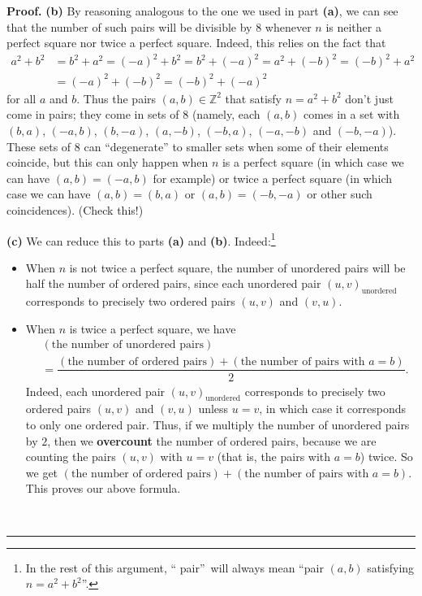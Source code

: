 \documentclass[numbers=enddot,12pt,final,onecolumn,notitlepage]{scrartcl}%
\numberwithin{exer}{subsection}
\theoremstyle{definition}
\newenvironment{proof}[1][Proof]{\noindent\textbf{#1.} }{\ \rule{0.5em}{0.5em}}
\begin{document}
\begin{proof}
\textbf{(b)} By reasoning analogous to the one we used in part \textbf{(a)},
we can see that the number of such pairs will be divisible by $8$ whenever $n$
is neither a perfect square nor twice a perfect square. Indeed, this relies on
the fact that
\begin{align*}
a^{2} + b^{2}  &  = b^{2} + a^{2} = \left(  -a \right)  ^{2} + b^{2} = b^{2} +
\left(  -a \right)  ^{2} = a^{2} + \left(  -b \right)  ^{2} = \left(  -b
\right)  ^{2} + a^{2}\\
&  = \left(  -a \right)  ^{2} + \left(  -b \right)  ^{2} = \left(  -b \right)
^{2} + \left(  -a \right)  ^{2}%
\end{align*}
for all $a$ and $b$. Thus the pairs $\left(  a, b \right)  \in\mathbb{Z}^{2}$
that satisfy $n = a^{2} + b^{2}$ don't just come in pairs; they come in sets
of $8$ (namely, each $\left(  a, b \right)  $ comes in a set with $\left(  b,
a \right)  $, $\left(  -a, b \right)  $, $\left(  b, -a \right)  $, $\left(
a, -b \right)  $, $\left(  -b, a \right)  $, $\left(  -a, -b \right)  $ and
$\left(  -b, -a \right)  $). These sets of $8$ can ``degenerate'' to smaller
sets when some of their elements coincide, but this can only happen when $n$
is a perfect square (in which case we can have $\left(  a, b \right)  =
\left(  -a, b \right)  $ for example) or twice a perfect square (in which case
we can have $\left(  a, b \right)  = \left(  b, a \right)  $ or $\left(  a, b
\right)  = \left(  -b, -a \right)  $ or other such coincidences). (Check this!)

\textbf{(c)} We can reduce this to parts \textbf{(a)} and \textbf{(b)}.
Indeed:\footnote{In the rest of this argument, \textquotedblleft
pair\textquotedblright\ will always mean \textquotedblleft pair $\left(
a,b\right)  $ satisfying $n=a^{2}+b^{2}$\textquotedblright.}

\begin{itemize}
\item When $n$ is not twice a perfect square, the number of unordered pairs
will be half the number of ordered pairs, since each unordered pair $\left(
u,v\right)  _{\text{unordered}}$ corresponds to precisely two ordered pairs
$\left(  u,v\right)  $ and $\left(  v,u\right)  $.

\item When $n$ is twice a perfect square, we have%
\begin{align*}
&  \left(  \text{the number of unordered pairs}\right) \\
&  =\dfrac{\left(  \text{the number of ordered pairs}\right)  +\left(
\text{the number of pairs with }a=b\right)  }{2}.
\end{align*}
Indeed, each unordered pair $\left(  u,v\right)  _{\text{unordered}}$
corresponds to precisely two ordered pairs $\left(  u,v\right)  $ and $\left(
v,u\right)  $ unless $u=v$, in which case it corresponds to only one ordered
pair. Thus, if we multiply the number of unordered pairs by $2$, then we
\textbf{overcount} the number of ordered pairs, because we are counting the
pairs $\left(  u,v\right)  $ with $u=v$ (that is, the pairs with $a=b$) twice.
So we get $\left(  \text{the number of ordered pairs}\right)  +\left(
\text{the number of pairs with }a=b\right)  $. This proves our above formula.


\end{itemize}
\end{proof}
\end{document}
